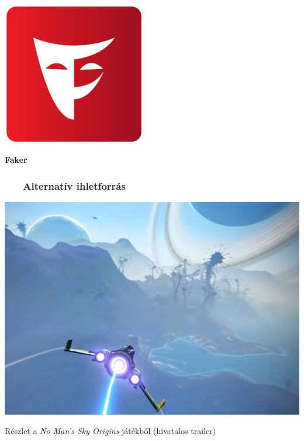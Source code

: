 \documentclass[
    aspectratio=169,
]{beamer}
\newcommand{\slidetitle}[2]{\frametitle{{\small #1 ~ \ding{226} ~ } \normalsize \textbf{#2} }}
\begin{document}
\begin{frame}[fragile]
\begin{minipage}[c]{0.35\textwidth}
        \pause
        
        \vspace{10pt}
        
        \includegraphics[width=0.47\textwidth, frame]{image/faker}\par
        \textbf{Faker}
        
    \end{minipage}%
    \hspace*{\fill}%
\end{frame}

\begin{frame}
    \slidetitle{\sectionshorttitle}{Alternatív ihletforrás}
    
    \centering
    
    \includegraphics[height=0.8\textheight]{image/nomanssky}
    
    \smallskip
    
    \footnotesize{Részlet a \textit{No Man's Sky Origins} játékból (hivatalos trailer)}
\end{frame}
\end{document}
